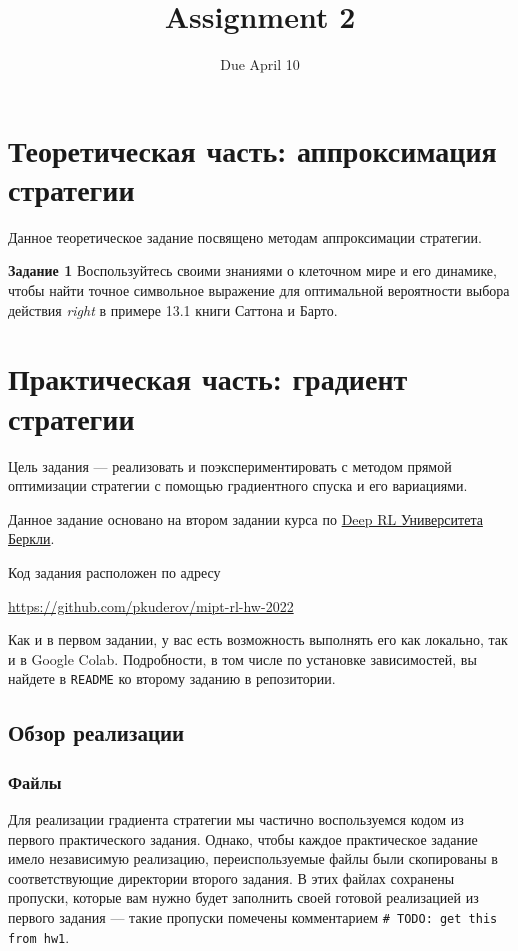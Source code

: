 \documentclass[12pt, oneside]{article}
\author{Due April 10}
\title{Assignment 2}
\date{}
\begin{document}
\maketitle
\thispagestyle{fancy}

\section{Теоретическая часть: аппроксимация стратегии}

Данное теоретическое задание посвящено методам аппроксимации стратегии.

\textbf{Задание 1} Воспользуйтесь своими знаниями о клеточном мире и его динамике, чтобы найти точное символьное выражение для оптимальной вероятности выбора действия \textit{right} в примере 13.1 книги Саттона и Барто.

\section{Практическая часть: градиент стратегии}

Цель задания --- реализовать и поэкспериментировать с методом прямой оптимизации стратегии с помощью градиентного спуска и его вариациями.

Данное задание основано на втором задании курса по \href{http://rail.eecs.berkeley.edu/deeprlcourse/}{Deep RL Университета Беркли}.

Код задания расположен по адресу
\begin{center}
    \href{https://github.com/pkuderov/mipt-rl-hw-2022}{https://github.com/pkuderov/mipt-rl-hw-2022}
\end{center}

Как и в первом задании, у вас есть возможность выполнять его как локально, так и в Google Colab. Подробности, в том числе по установке зависимостей, вы найдете в \verb|README| ко второму заданию в репозитории.

\subsection{Обзор реализации}

\subsubsection{Файлы}

Для реализации градиента стратегии мы частично воспользуемся кодом из первого практического задания. Однако, чтобы каждое практическое задание имело независимую реализацию, переиспользуемые файлы были скопированы в соответствующие директории второго задания. В этих файлах сохранены пропуски, которые вам нужно будет заполнить своей готовой реализацией из первого задания --- такие пропуски помечены комментарием \verb|# TODO: get this from hw1|.
\end{document}
